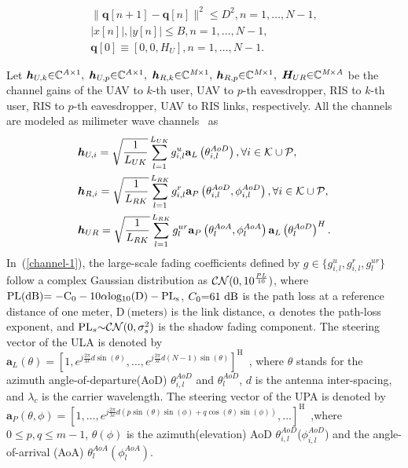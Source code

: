 \documentclass[journal]{IEEEtran}
\begin{document}
\begin{subequations}\label{mobility-1}
	\begin{gather}
  \|\bm{q}[n+1]-\bm{q}[n] \|^2 \leq D^2 , n=1, \ldots, N-1,\\
  \left\lvert x[n] \right\rvert ,\left\lvert y[n] \right\rvert  \leq B , n=1, \ldots, N-1,\\
  \bm{q}[0] \equiv [0,0,H_{U}] , n=1, \ldots, N-1.
	\end{gather}
\end{subequations}

Let ${\bm{h}}_{U,k}\rm{\in} \mathbb{C}^{\emph{A}\times 1},$ $\bm{h}_{U,p} \rm{\in} \mathbb{C}^{\emph{A}\times 1},$ $ \bm{h}_{R,k} \rm{\in} \mathbb{C}^{\emph{M}\times 1},$ $\bm{h}_{R,p} \rm{\in} \mathbb{C}^{\emph{M}\times 1},$ 
$\bm{H}_{UR} \rm{\in} \mathbb{C}^{\emph{M}\times \emph{A}}$ be the channel gains of the UAV to $k$-th user, UAV to $p$-th eavesdropper, RIS to $k$-th user, RIS to $p$-th eavesdropper, UAV to RIS links, respectively. All the channels are modeled as milimeter wave channels~\cite{mmwave-1}\cite{mmwave-2} as 
\begin{subequations}\label{channel-1}
	\begin{align}
  &{\bm{h}}_{U,i}=\sqrt{\frac{1}{L_{UK}}} \sum_{l = 1}^{L_{UK}} g^{u}_{i,l}{\mathbf{a }}_{L}  \left(\theta_{i,l}^{AoD}\right),\forall i \in {\cal K}\cup {\cal P},\\
  &{\bm{h}}_{R,i}=\sqrt{\frac{1}{L_{RK}}} \sum_{l = 1}^{L_{RK}} g^{r}_{i,l}{\mathbf{a }}_{P}  \left(\theta_{i,l}^{AoD}, \phi_{i,l}^{AoD}\right),\forall i \in {\cal K}\cup {\cal P},\\
  &{\bm{h}}_{UR}=\sqrt{\frac{1}{L_{RK}}} \sum_{l = 1}^{L_{RK}} g^{ur}_{l}{\mathbf{a }}_{P}  \left(\theta_{l}^{AoA},\phi_{l}^{AoA}\right){\mathbf{a }}_{L}  \left(\theta_{l}^{AoD}\right)^H .
  \end{align}
\end{subequations}
\noindent In~(\ref{channel-1}), the large-scale fading coefficients defined by  $g \in \{g^u_{i,l},g^{r}_{i,l},g^{ur}_{l}\}$ follow a complex Gaussian distribution as ${\cal CN}(0, 10^{\frac{PL}{10}})$, where $\text{PL(dB)} {\rm =  -C_0-10 \alpha log_{10}(D)-PL_s}$, $C_0{\rm =}61\ \text{dB}$ is the path loss at a reference distance of one meter, $\text{D}\ \text{(meters)}$ is the link distance, $\alpha$ denotes the path-loss exponent, and $\text{PL}_s {\rm \sim} {\cal CN}(0, \sigma_s^2)$ is the shadow fading component. The steering vector of the ULA is denoted by $\mathbf{a}_{L}(\theta)=\left[1, e^{j \frac{2 \pi}{\lambda c} d \sin (\theta)}, \ldots, e^{j \frac{2 \pi}{\lambda c} d(N-1) \sin (\theta)}\right]^{\mathrm{H}}$~\cite{mmwave-4-UPA-ULA}, where $\theta$ stands for the azimuth angle-of-departure(AoD) $\theta_{i,l}^{AoD}$ and $ \theta_{l}^{AoD}$, $d$ is the antenna inter-spacing, and $\lambda_c$ is the carrier wavelength. The steering vector of the UPA is denoted by $\mathbf{a}_{P}(\theta, \phi)=\left[1, \ldots, e^{j \frac{2 \pi}{\lambda c} d(p \sin (\theta) \sin (\phi)+q \cos (\theta) \sin (\phi))}, \ldots\right]^{\mathrm{H}}$~\cite{mmwave-4-UPA-ULA},where $0\leq {p,q}\leq m-1$, $\theta(\phi)$ is the azimuth(elevation) AoD $\theta_{i,l}^{AoD}$($\phi_{i,l}^{AoD}$) and the angle-of-arrival (AoA) $\theta_{l}^{AoA}(\phi_{l}^{AoA})$.
\end{document}
